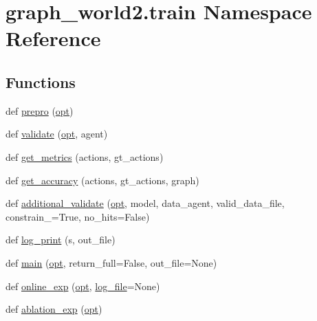 \hypertarget{namespacegraph__world2_1_1train}{}\section{graph\+\_\+world2.\+train Namespace Reference}
\label{namespacegraph__world2_1_1train}
\subsection*{Functions}
\begin{DoxyCompactItemize}
\item 
def \hyperlink{namespacegraph__world2_1_1train_ac238655ccbc748146d1cbaaac96433a5}{prepro} (\hyperlink{namespacegraph__world2_1_1train_a286634b8300deedee0924d4ecac34fa6}{opt})
\item 
def \hyperlink{namespacegraph__world2_1_1train_aa00e41e1619128901ea053170fedef0b}{validate} (\hyperlink{namespacegraph__world2_1_1train_a286634b8300deedee0924d4ecac34fa6}{opt}, agent)
\item 
def \hyperlink{namespacegraph__world2_1_1train_ab3ba8ae63848a00ac638b31329041f6b}{get\+\_\+metrics} (actions, gt\+\_\+actions)
\item 
def \hyperlink{namespacegraph__world2_1_1train_a8bb8c5ab11be91db36eb268e1c2088a8}{get\+\_\+accuracy} (actions, gt\+\_\+actions, graph)
\item 
def \hyperlink{namespacegraph__world2_1_1train_aaff96a1b7f0cafac9dab96cbc02ae4d0}{additional\+\_\+validate} (\hyperlink{namespacegraph__world2_1_1train_a286634b8300deedee0924d4ecac34fa6}{opt}, model, data\+\_\+agent, valid\+\_\+data\+\_\+file, constrain\+\_\+=True, no\+\_\+hits=False)
\item 
def \hyperlink{namespacegraph__world2_1_1train_a145007eac2c8c1c128ec06f4477c943e}{log\+\_\+print} (s, out\+\_\+file)
\item 
def \hyperlink{namespacegraph__world2_1_1train_af3dec887619817c1a7a38930ffcfd1cb}{main} (\hyperlink{namespacegraph__world2_1_1train_a286634b8300deedee0924d4ecac34fa6}{opt}, return\+\_\+full=False, out\+\_\+file=None)
\item 
def \hyperlink{namespacegraph__world2_1_1train_a8f5e91b9cb92f65b8b096d7eb5dbf2e7}{online\+\_\+exp} (\hyperlink{namespacegraph__world2_1_1train_a286634b8300deedee0924d4ecac34fa6}{opt}, \hyperlink{namespacegraph__world2_1_1train_a37e0c8009dd20c5ccb703af34d50a44e}{log\+\_\+file}=None)
\item 
def \hyperlink{namespacegraph__world2_1_1train_a4a2155646856189e143dbc828baef945}{ablation\+\_\+exp} (\hyperlink{namespacegraph__world2_1_1train_a286634b8300deedee0924d4ecac34fa6}{opt})
\end{DoxyCompactItemize}
